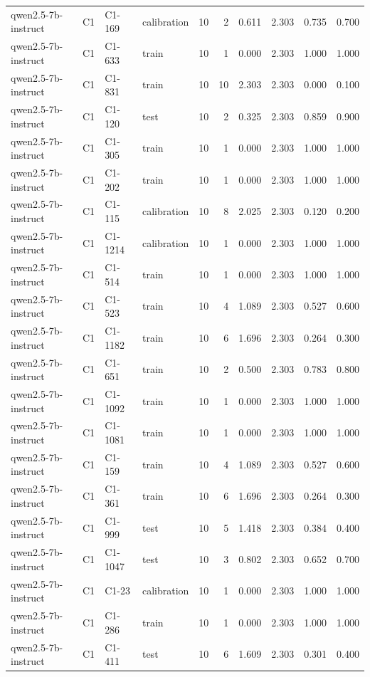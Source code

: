 \begin{table}
\begin{tabular}{llllrrrrrr}
qwen2.5-7b-instruct & C1 & C1-169 & calibration & 10 & 2 & 0.611 & 2.303 & 0.735 & 0.700 \\
qwen2.5-7b-instruct & C1 & C1-633 & train & 10 & 1 & 0.000 & 2.303 & 1.000 & 1.000 \\
qwen2.5-7b-instruct & C1 & C1-831 & train & 10 & 10 & 2.303 & 2.303 & 0.000 & 0.100 \\
qwen2.5-7b-instruct & C1 & C1-120 & test & 10 & 2 & 0.325 & 2.303 & 0.859 & 0.900 \\
qwen2.5-7b-instruct & C1 & C1-305 & train & 10 & 1 & 0.000 & 2.303 & 1.000 & 1.000 \\
qwen2.5-7b-instruct & C1 & C1-202 & train & 10 & 1 & 0.000 & 2.303 & 1.000 & 1.000 \\
qwen2.5-7b-instruct & C1 & C1-115 & calibration & 10 & 8 & 2.025 & 2.303 & 0.120 & 0.200 \\
qwen2.5-7b-instruct & C1 & C1-1214 & calibration & 10 & 1 & 0.000 & 2.303 & 1.000 & 1.000 \\
qwen2.5-7b-instruct & C1 & C1-514 & train & 10 & 1 & 0.000 & 2.303 & 1.000 & 1.000 \\
qwen2.5-7b-instruct & C1 & C1-523 & train & 10 & 4 & 1.089 & 2.303 & 0.527 & 0.600 \\
qwen2.5-7b-instruct & C1 & C1-1182 & train & 10 & 6 & 1.696 & 2.303 & 0.264 & 0.300 \\
qwen2.5-7b-instruct & C1 & C1-651 & train & 10 & 2 & 0.500 & 2.303 & 0.783 & 0.800 \\
qwen2.5-7b-instruct & C1 & C1-1092 & train & 10 & 1 & 0.000 & 2.303 & 1.000 & 1.000 \\
qwen2.5-7b-instruct & C1 & C1-1081 & train & 10 & 1 & 0.000 & 2.303 & 1.000 & 1.000 \\
qwen2.5-7b-instruct & C1 & C1-159 & train & 10 & 4 & 1.089 & 2.303 & 0.527 & 0.600 \\
qwen2.5-7b-instruct & C1 & C1-361 & train & 10 & 6 & 1.696 & 2.303 & 0.264 & 0.300 \\
qwen2.5-7b-instruct & C1 & C1-999 & test & 10 & 5 & 1.418 & 2.303 & 0.384 & 0.400 \\
qwen2.5-7b-instruct & C1 & C1-1047 & test & 10 & 3 & 0.802 & 2.303 & 0.652 & 0.700 \\
qwen2.5-7b-instruct & C1 & C1-23 & calibration & 10 & 1 & 0.000 & 2.303 & 1.000 & 1.000 \\
qwen2.5-7b-instruct & C1 & C1-286 & train & 10 & 1 & 0.000 & 2.303 & 1.000 & 1.000 \\
qwen2.5-7b-instruct & C1 & C1-411 & test & 10 & 6 & 1.609 & 2.303 & 0.301 & 0.400 \\

\end{tabular}
\end{table}
